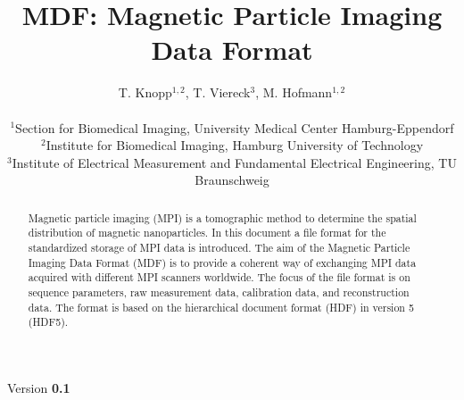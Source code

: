 \documentclass[landscape]{article} %
\begin{document}
\title{MDF: Magnetic Particle Imaging Data Format}
\newcommand{\version}{0.1}

\author{
T. Knopp$^{1,2}$, T. Viereck$^{3}$, M. Hofmann$^{1,2}$ \\ \\
$^1$Section for Biomedical Imaging, University Medical Center Hamburg-Eppendorf\\
$^2$Institute for Biomedical Imaging, Hamburg University of Technology\\
$^3$Institute of Electrical Measurement and Fundamental Electrical Engineering, TU Braunschweig\\
}


\maketitle
\begin{center}
Version \textbf{\version}
\end{center}

\begin{abstract}
Magnetic particle imaging (MPI) is a tomographic method to determine the spatial distribution of magnetic nanoparticles. In this document a file format for the standardized storage of MPI data is introduced. The aim of the Magnetic Particle Imaging Data Format (MDF) is to provide a coherent way of exchanging MPI data acquired with different MPI scanners worldwide. The focus of the file format is on sequence parameters, raw measurement data, calibration data, and reconstruction data. The format is based on the hierarchical document format (HDF) in version 5 (HDF5).
\end{abstract}
\end{document}
